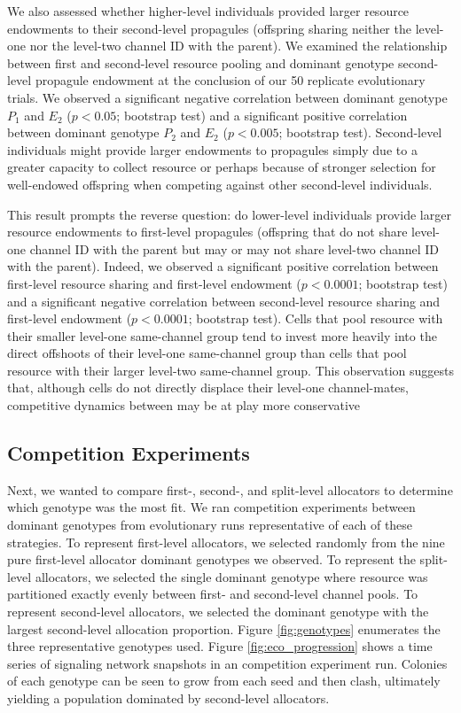 We also assessed whether higher-level individuals provided larger resource endowments to their second-level propagules (offspring sharing neither the level-one nor the level-two channel ID with the parent).
We examined the relationship between first and second-level resource pooling and dominant genotype second-level propagule endowment at the conclusion of our 50 replicate evolutionary trials.
We observed a significant negative correlation between dominant genotype $P_1$ and $E_2$ ($p < 0.05$; bootstrap test) and a significant positive correlation between dominant genotype $P_2$ and $E_2$ ($p <  0.005$; bootstrap test).
Second-level individuals might provide larger endowments to propagules simply due to a greater capacity to collect resource or perhaps because of stronger selection for well-endowed offspring when competing against other second-level individuals.

This result prompts the reverse question: do lower-level individuals provide  larger resource endowments to first-level propagules (offspring that do not share level-one channel ID with the parent but may or may not share level-two channel ID with the parent).
Indeed, we observed a significant positive correlation between first-level resource sharing and first-level endowment ($p < 0.0001$; bootstrap test) and a significant negative correlation between second-level resource sharing and first-level endowment ($p < 0.0001$; bootstrap test).
Cells that pool resource with their smaller level-one same-channel group tend to invest more heavily into the direct offshoots of their level-one same-channel group than cells that pool resource with their larger level-two same-channel group.
This observation suggests that, although cells do not directly displace their level-one channel-mates, competitive dynamics between may be at play more conservative

\subsection{Competition Experiments}



Next, we wanted to compare first-, second-, and split-level allocators to determine which genotype was the most fit.
We ran competition experiments between dominant genotypes from evolutionary runs representative of each of these strategies.
To represent first-level allocators, we selected randomly from the nine pure first-level allocator dominant genotypes we observed.
To represent the split-level allocators, we selected the single dominant genotype where resource was partitioned exactly evenly between first- and second-level channel pools.
To represent second-level allocators, we selected the dominant genotype with the largest second-level allocation proportion.
Figure \ref{fig:genotypes} enumerates the three representative genotypes used.
Figure \ref{fig:eco_progression} shows a time series of signaling network snapshots in an competition experiment run.
Colonies of each genotype can be seen to grow from each seed and then clash, ultimately yielding a population dominated by second-level allocators.

